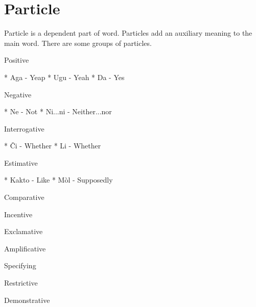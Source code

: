 \section{Particle}

Particle is a dependent part of word. Particles add an auxiliary meaning to the main word. There are some groups of particles.

Positive

* Aga - Yeap
* Ugu - Yeah
* Da - Yes

Negative

* Ne - Not
* Ni...ni - Neither...nor

Interrogative

* Či - Whether
* Li - Whether

Estimative

* Kakto - Like
* Mòl - Supposedly

Comparative

Incentive

Exclamative

Amplificative


Specifying

Restrictive

Demonstrative


